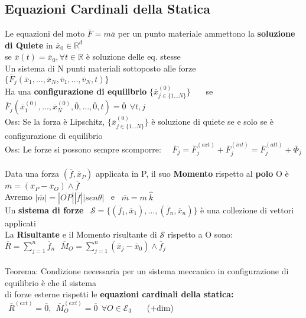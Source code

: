 \documentclass{article}
\begin{document}
\subsection{Equazioni Cardinali della Statica}
%
Le equazioni del moto $\overline{F}=m\overline{a}$ per un punto materiale ammettono la \textbf{soluzione di Quiete} in $\overline{x}_0\in\mathbb{R}^d$\\
\phantom{\ \ \ \ } se $\overline{x}(t)=\overline{x}_0, \forall t \in \mathbb{R}$ è soluzione delle eq. stesse\\
%
Un sistema di N punti materiali sottoposto alle forze $\{\overline{F}_j(\overline{x}_1,...,\overline{x}_N,\overline{v}_1,...,\overline{v}_N,t)\}$\\
\phantom{\ \ \ \ } Ha una \textbf{configurazione di equilibrio} $\{\overline{x}_{j\in\{1...N\}}^{(0)}\}$ \ \ \ se \
$\overline{F}_j(\overline{x}_1^{(0)},...,\overline{x}_N^{(0)},\overline{0},...,\overline{0},t)=\overline{0} \ \ \forall t,j$ \\
%
Oss: Se la forza è Lipschitz, $\{\overline{x}_{j\in\{1...N\}}^{(0)}\}$ è soluzione di quiete se e solo se è configurazione di equilibrio \\
Oss: Le forze si possono sempre scomporre: \ \
$\overline{F}_j=\overline{F}_j^{(ext)}+\overline{F}_j^{(int)}=\overline{F}_j^{(att)}+\overline{\Phi}_j$ \\ \\
%
%
%
Data una forza $(\overline{f},\overline{x}_P)$ applicata in P, il suo \textbf{Momento} rispetto al \textbf{polo} O è $\overline{m}=(\overline{x}_P-\overline{x}_O)\wedge\overline{f}$\\
\phantom{\ \ \ \ } Avremo $|\overline{m}|= |\overline{OP}||\overline{f}||sen\theta|$ \ e \ $\overline{m}=m \ \hat{k}$ \\
%
Un \textbf{sistema di forze} \ $\mathcal{S}=\{(\overline{f}_1,\overline{x}_1),...,(\overline{f}_n,\overline{x}_n)\}$ è una collezione di vettori applicati \\
La \textbf{Risultante} e il Momento risultante di $\mathcal{S}$ rispetto a O sono: \ \ $\overline{R}=\sum_{j=1}^n\overline{f}_n \ \ \ \overline{M}_O=\sum^n_{j=1}(\overline{x}_j-\overline{x}_0)\wedge\overline{f}_j$ \\ \\
%
%
Teorema: Condizione necessaria per un sistema meccanico in configurazione di equilibrio è che il sistema \\ \phantom{\ } di forze esterne rispetti le \textbf{equazioni cardinali della statica:} $\ \ \overline{R}^{(ext)}=\overline{0}, \ \ \overline{M}_O^{(ext)}=\overline{0} \ \ \forall O \in \mathcal{E}_3$ \ \ \ (+dim)\\
\end{document}
